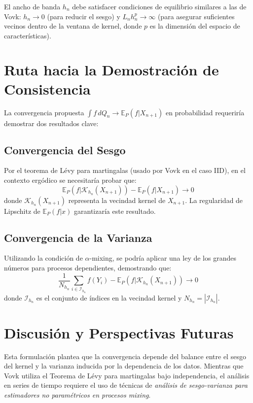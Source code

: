 El ancho de banda $h_n$ debe satisfacer condiciones de equilibrio similares a las de Vovk: $h_n \to 0$ (para reducir el sesgo) y $L_n h_n^p \to \infty$ (para asegurar suficientes vecinos dentro de la ventana de kernel, donde $p$ es la dimensión del espacio de características).

\section{Ruta hacia la Demostración de Consistencia}

La convergencia propuesta $\int f \, dQ_n \to \mathbb{E}_P(f | X_{n+1})$ en probabilidad requeriría demostrar dos resultados clave:

\subsection{Convergencia del Sesgo}

Por el teorema de Lévy para martingalas (usado por Vovk en el caso IID), en el contexto ergódico se necesitaría probar que:
\begin{equation}
    \mathbb{E}_P(f | \mathcal{K}_{h_n}(X_{n+1})) - \mathbb{E}_P(f | X_{n+1}) \to 0
\end{equation}
donde $\mathcal{K}_{h_n}(X_{n+1})$ representa la vecindad kernel de $X_{n+1}$. La regularidad de Lipschitz de $\mathbb{E}_P(f | x)$ garantizaría este resultado.

\subsection{Convergencia de la Varianza}

Utilizando la condición de $\alpha$-mixing, se podría aplicar una ley de los grandes números para procesos dependientes, demostrando que:
\begin{equation}
    \frac{1}{N_{h_n}} \sum_{i \in \mathcal{I}_{h_n}} f(Y_i) - \mathbb{E}_P(f | \mathcal{K}_{h_n}(X_{n+1})) \to 0
\end{equation}
donde $\mathcal{I}_{h_n}$ es el conjunto de índices en la vecindad kernel y $N_{h_n} = |\mathcal{I}_{h_n}|$.

\section{Discusión y Perspectivas Futuras}

Esta formulación plantea que la convergencia depende del balance entre el sesgo del kernel y la varianza inducida por la dependencia de los datos. Mientras que Vovk utiliza el Teorema de Lévy para martingalas bajo independencia, el análisis en series de tiempo requiere el uso de técnicas de \textit{análisis de sesgo-varianza para estimadores no paramétricos en procesos mixing}.

